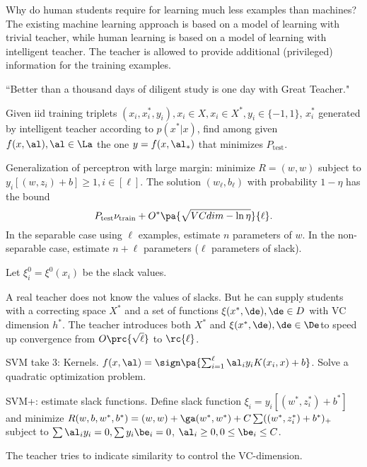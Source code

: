 Why do human students require for learning much less examples than machines? The existing machine learning approach is based on a model of learning with trivial teacher, while human learning is based on a model of learning with intelligent teacher. The teacher is allowed to provide additional (privileged) information for the training examples.

``Better than a thousand days of diligent study is one day with Great Teacher."

\begin{mdl}
Given iid training triplets $(x_i,x_i^*,y_i),x_i\in X,x_i\in X^*,y_i\in \{-1,1\}$, $x_i^*$ generated by intelligent teacher according to $p(x^*|x)$, find among given $f(x,\al),\al\in \La$ the one $y=f(x,\al_{*})$ that minimizes $P_{\text{test}}$.
\end{mdl}


Generalization of perceptron with large margin: minimize $R=(w,w)$ subject to $y_i[(w,z_i)+b]\ge 1,i\in [\ell]$. The solution $(w_{\ell},b_{\ell})$ with probability $1-\eta$ has the bound
\[
P_{\text{test}}\nu_{\text{train}}+O^*\pa{\sqrt{VCdim-\ln \eta}}{\ell}.
\]
In the separable case using $\ell$ examples, estimate $n$ parameters of $w$. In the non-separable case, estimate $n+\ell$ parameters ($\ell$ parameters of slack).

Let $\xi_i^0=\xi^0(x_i)$ be the slack values.

A real teacher does not know the values of slacks. But he can supply students with a correcting space $X^*$ and a set of functions $\xi(x^*,\de),\de\in D$ with VC dimension $h^*$. The teacher introduces both $X^*$ and $\xi(x^*,\de),\de\in \De$to speed up convergence from $O\prc{\sqrt{\ell}}$ to $\rc{\ell}$.

SVM take 3: Kernels. $f(x,\al)=\sign\pa{\sum_{i=1}^{\ell} \al_iy_iK(x_i,x)+b}$. Solve a quadratic optimization problem. %

SVM+: estimate slack functions. Define slack function $\xi_i=y_i[(w^*,z_i^*)+b^*]$ and minimize $R(w,b,w^*,b^*)=(w,w)+\ga(w^*,w^*)+C\sum ((w^*,z_i^*)+b^*)_+$ subject to $\sum \al_iy_i=0,\sum y_i\be_i=0$, $\al_i\ge0,0\le \be_i\le C$.

The teacher tries to indicate similarity to control the VC-dimension. %

